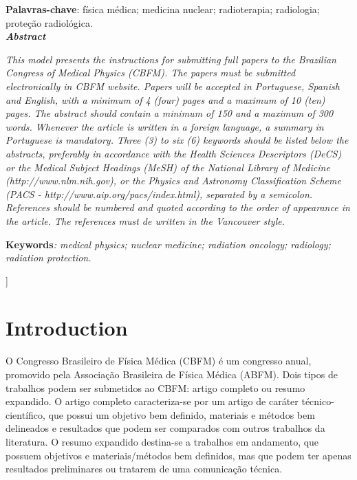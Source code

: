 \documentclass[10pt,twoside,twocolumn]{article}
\begin{document}
\begin{@twocolumnfalse}
\textbf{Palavras-chave}: f\'{i}sica m\'{e}dica; medicina nuclear; radioterapia; radiologia; prote\c{c}\~{a}o radiol\'{o}gica.\\



\textbf{\textit{Abstract}}

\textit{This model presents the instructions for submitting full papers to the Brazilian Congress of Medical Physics (CBFM). The papers must be submitted electronically in CBFM website. Papers will be accepted in Portuguese, Spanish and English, with a minimum of 4 (four) pages and a maximum of 10 (ten) pages. The abstract should contain a minimum of 150 and a maximum of 300 words. Whenever the article is written in a foreign language, a summary in Portuguese is mandatory. Three (3) to six (6) keywords should be listed below the abstracts, preferably in accordance with the Health Sciences Descriptors (DeCS) or the Medical Subject Headings (MeSH) of the National Library of Medicine (http://www.nlm.nih.gov), or the Physics and Astronomy Classification Scheme (PACS - http://www.aip.org/pacs/index.html), separated by a semicolon. References should be numbered and quoted according to the order of appearance in the article. The references must de written in the Vancouver style.}

\textbf{Keywords}\textit{: medical physics; nuclear medicine; radiation oncology; radiology; radiation protection.} 

\vspace{\baselineskip}
    \end{@twocolumnfalse}
 ]
 
 
 
\section{Introduction}

O Congresso Brasileiro de Física Médica (CBFM) é um congresso anual, promovido pela Associação Brasileira de Física Médica (ABFM). 
Dois tipos de trabalhos podem ser submetidos ao CBFM: artigo completo ou resumo expandido. O  artigo completo caracteriza-se por um artigo de caráter técnico-científico, que possui um objetivo bem definido, materiais e métodos bem delineados e resultados que podem ser comparados com outros trabalhos da literatura. O resumo expandido destina-se a trabalhos em andamento, que possuem objetivos e materiais/métodos bem definidos, mas que podem ter apenas resultados preliminares ou tratarem de uma comunicação técnica.
\end{document}
